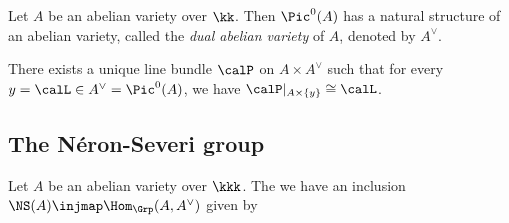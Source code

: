     \begin{theorem}\label{thm: dual abelian varieties}
        Let $A$ be an abelian variety over $\kk$. 
        Then \(\Pic^0(A) \) has a natural structure of an abelian variety, called the \emph{dual abelian variety} of $A$, denoted by $A^\vee$.
    \end{theorem}

    \begin{proposition}\label{prop: the Poincare line bundle}
        There exists a unique line bundle \(\calP\) on \(A \times A^\vee\) such that for every \(y = \calL \in A^\vee = \Pic^0(A)\), we have \(\calP|_{A \times \{y\}} \cong \calL\).
    \end{proposition}


\subsection{The N\'eron-Severi group}


    \begin{theorem}\label{thm:NS_A_as_homomorphisms_from_A_to_A_dual}
        Let \(A\) be an abelian variety over \(\kkk\).
        The we have an inclusion \(\NS(A) \injmap \Hom_{\Grp}(A, A^\vee)\) given by 
    \end{theorem}